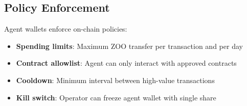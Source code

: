 \subsection{Policy Enforcement}

Agent wallets enforce on-chain policies:

\begin{itemize}
    \item \textbf{Spending limits}: Maximum ZOO transfer per transaction and per day
    \item \textbf{Contract allowlist}: Agent can only interact with approved contracts
    \item \textbf{Cooldown}: Minimum interval between high-value transactions
    \item \textbf{Kill switch}: Operator can freeze agent wallet with single share
\end{itemize}

